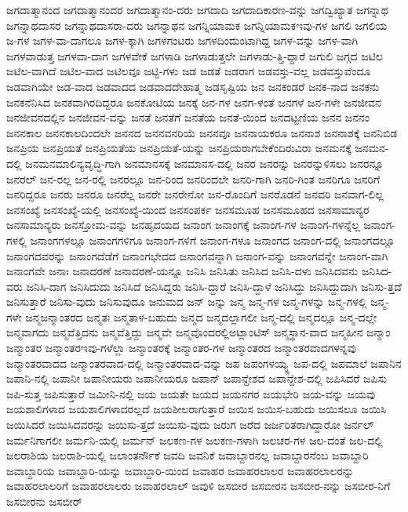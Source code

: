 {ಜಗದಾತ್ಮಾನಂದ
ಜಗದಾತ್ಮಾನಂದರ
ಜಗದಾತ್ಮಾನಂ-ದರು
ಜಗದಾದಿ
ಜಗದಾದಿಕಾರಣ-ವನ್ನು
ಜಗದ್ವಿಖ್ಯಾತ
ಜಗನ್ನಾಥ
ಜಗನ್ನಾಥದಾಸರ
ಜಗನ್ನಾಥದಾಸರಾ-ದರು
ಜಗನ್ನಾಥನ
ಜಗನ್ನಿಯಾಮಕ
ಜಗನ್ನಿಯಾಮಕಇವು-ಗಳ
ಜಗಲಿ
ಜಗಲಿಯ
ಜ-ಗಳ
ಜಗಳ-ವಾ-ದಾಗಲೂ
ಜಗಳ-ಕ್ಕಾಗಿ
ಜಗಳಗಂಟರು
ಜಗಳದಿಂದುಂಟಾಗಿದ್ದ
ಜಗಳ-ವನ್ನು
ಜಗಳ-ವಾಗಿ
ಜಗಳವಾಡುತ್ತ
ಜಗಳವಾ-ದಾಗ
ಜಗಳವೇಕೆ
ಜಗಳಾಡಿ
ಜಗಳಾಡುತ್ತಲೇ
ಜಗಳಾಡು-ತ್ತಿ-ದ್ದಾರೆ
ಜಗುಲಿ
ಜಗ್ಗದ
ಜಟಿಲ
ಜಟಿಲ-ವಾಗಿದೆ
ಜಟಿಲ-ವಾದ
ಜಟಿಲವೂ
ಜಟ್ಟಿ-ಗಳು
ಜಡ
ಜಡತೆ
ಜಡರಾಗ
ಜಡವಸ್ತು-ವಲ್ಲ
ಜಡವಸ್ತುವೆಂದೂ
ಜಡವಾಗಿಯೇ
ಜಡ-ವಾದ
ಜಡವಾದದ
ಜಡವಾದದೇಹಾತ್ಮ
ಜಡಸೃಷ್ಟಿಯ
ಜನ
ಜನಕಂಡರೆ
ಜನಕ-ನಾದ
ಜನಕನು
ಜನಕನೆನಿಸಿದ
ಜನಕವಾಗಿರದಿದ್ದರೂ
ಜನಕೋಟಿಯ
ಜನಕ್ಕೆ
ಜನ-ಗಳ
ಜನಗ-ಳಂತೆ
ಜನಗಳೆ
ಜನ-ಗಳೇ
ಜನಜೀವನ
ಜನಜೀವನದಲ್ಲಿನ
ಜನಜೀವನ-ವನ್ನು
ಜನತೆ
ಜನತೆಗೆ
ಜನತೆಯ
ಜನತೆ-ಯಿಂದ
ಜನದಟ್ಟಣಿಯ
ಜನನ
ಜನನಂ
ಜನನಕಾಲ
ಜನನಕಾಲದಿಂದಲೇ
ಜನನದ
ಜನನವನರಿಯೆ
ಜನನವೂ
ಜನನಾಯಕರೂ
ಜನನಾಶ
ಜನನಾಶಕ್ಕೆ
ಜನನಿಬಿಡ
ಜನಪ್ರಿಯ
ಜನಪ್ರಿಯತೆ
ಜನಪ್ರಿಯತೆಯ
ಜನಪ್ರಿಯತೆ-ಯನ್ನು
ಜನಪ್ರಿಯರಾಗಬೇಕೆಂದಿರುವಿರಾ
ಜನಮನಕ್ಕೆ
ಜನಮನ-ದಲ್ಲಿ
ಜನಮನಮಾಲಿನ್ಯವೃದ್ಧಿ-ಗಾಗಿ
ಜನಮಾನಸಕ್ಕೆ
ಜನಮಾನಸ-ದಲ್ಲಿ
ಜನರ
ಜನರನ್ನು
ಜನರನ್ನುಳಿಸಲು
ಜನರನ್ನೂ
ಜನರಲ್
ಜನ-ರಲ್ಲ
ಜನ-ರಲ್ಲಿ
ಜನರಲ್ಲೂ
ಜನ-ರಿಂದ
ಜನರಿಂದಲೇ
ಜನರಿ-ಗಾಗಿ
ಜನರಿ-ಗಿಂತ
ಜನರಿಗೂ
ಜನರಿಗೆ
ಜನರಿದ್ದರೂ
ಜನರು
ಜನರೂ
ಜನರೆಲ್ಲ
ಜನರೇ
ಜನರೇನೋ
ಜನ-ರೊಂದಿಗೆ
ಜನರೊಡನೆ
ಜನವರಿ
ಜನವಾಗ-ಲಿಲ್ಲ
ಜನಸಂಖ್ಯೆ
ಜನಸಂಖ್ಯೆ-ಯಲ್ಲಿ
ಜನಸಂಖ್ಯೆ-ಯಿಂದ
ಜನಸಂಪರ್ಕ
ಜನಸಮೂಹ
ಜನಸಮೂಹದ
ಜನಸಾಮಾನ್ಯರ
ಜನಸಾಮಾನ್ಯರು
ಜನಸ್ತೋಮ-ವನ್ನು
ಜನಹೃದಯದ
ಜನಾಂಗ
ಜನಾಂಗಕ್ಕೆ
ಜನಾಂಗ-ಗಳ
ಜನಾಂಗ-ಗಳನ್ನೆಲ್ಲ
ಜನಾಂಗ-ಗಳಲ್ಲಿ
ಜನಾಂಗಗಳಲ್ಲೂ
ಜನಾಂಗಗಳಿಗೂ
ಜನಾಂಗ-ಗಳಿಗೆ
ಜನಾಂಗ-ಗಳೂ
ಜನಾಂಗದ
ಜನಾಂಗ-ದಲ್ಲಿ
ಜನಾಂಗದಲ್ಲೂ
ಜನಾಂಗದವರನ್ನು
ಜನಾಂಗದೆಡೆಗೆ
ಜನಾಂಗಭೇದದ
ಜನಾಂಗವನ್ನಾಗಿ
ಜನಾಂಗ-ವನ್ನು
ಜನಾಂಗವನ್ನೇ
ಜನಾಂಗ-ವಾಗಿ
ಜನಾಂಗವೇ
ಜನಾಃ
ಜನಾದರಣೆ
ಜನಾದರಣೆ-ಯನ್ನೂ
ಜನಿಸಿ
ಜನಿಸಿತು
ಜನಿಸಿದ
ಜನಿಸಿ-ದಳು
ಜನಿಸಿದವನು
ಜನಿಸಿದ-ವರು
ಜನಿಸಿ-ದಾಗ
ಜನಿಸಿದುದು
ಜನಿಸಿದೆ
ಜನಿಸಿದ್ದರು
ಜನಿಸಿ-ದ್ದಾರೆ
ಜನಿಸಿ-ದ್ದಾಳೆ
ಜನಿಸಿದ್ದು
ಜನಿಸಿದ್ದುದಾಗಿ
ಜನಿಸು-ತ್ತದೆ
ಜನಿಸುತ್ತಾರೆ
ಜನಿಸು-ವುದು
ಜನಿಸುವುದೂ
ಜನುಮದ
ಜನ್
ಜನ್ನು
ಜನ್ಮ
ಜನ್ಮ-ಗಳ
ಜನ್ಮ-ಗಳನ್ನು
ಜನ್ಮ-ಗಳಲ್ಲಿ
ಜನ್ಮ-ಗಳೇ
ಜನ್ಮಜನ್ಮಾಂತರದ
ಜನ್ಮತಃ
ಜನ್ಮತಾಳ-ಬಹುದು
ಜನ್ಮದ
ಜನ್ಮದಲ್ಲಾಗಲೀ
ಜನ್ಮ-ದಲ್ಲಿ
ಜನ್ಮದಲ್ಲೂ
ಜನ್ಮ-ದಲ್ಲೇ
ಜನ್ಮವಾಗದು
ಜನ್ಮವೆತ್ತಿದನು
ಜನ್ಮವೆತ್ತಿದ್ದು
ಜನ್ಮವೇ
ಜನ್ಮವೊಂದರಲ್ಲಿಅಟ್ಲಾಂಟಿಸ್
ಜನ್ಮಸ್ಥಾನ-ವಾದ
ಜನ್ಮಹೀನ
ಜನ್ಮಾಂ
ಜನ್ಮಾಂತರ
ಜನ್ಮಾಂತರಇವು-ಗಳೆಲ್ಲಾ
ಜನ್ಮಾಂತರಕ್ಕೆ
ಜನ್ಮಾಂತರ-ಗಳ
ಜನ್ಮಾಂತರದ
ಜನ್ಮಾಂತರವಾದಗಳನ್ನವು
ಜನ್ಮಾಂತರವಾದದ
ಜನ್ಮಾಂತರವಾದ-ದಲ್ಲಿ
ಜನ್ಮಾಂತರವಾದ-ವನ್ನು
ಜಪ
ಜಪಂಗಳಯ್ಯ್ಣ
ಜಪ-ದಲ್ಲಿ
ಜಪಮಾಲೆ
ಜಪಾನಿನ
ಜಪಾನಿ-ನಲ್ಲಿ
ಜಪಾನೀ
ಜಪಾನೀಯರು
ಜಪಾನೀಯರೂ
ಜಪಾನ್
ಜಪಾನ್ದೇಶದ
ಜಪಾನ್ದೇಶ-ದಲ್ಲಿ
ಜಪಿಸಿದರೆ
ಜಪಿಸು
ಜಪಿ-ಸುತ್ತ
ಜಪಿಸುತ್ತಾರೆ
ಜಮೀನಿ-ನಲ್ಲಿ
ಜಯ
ಜಯತೇ
ಜಯದ
ಜಯನಗರ
ಜಯಭೇರಿ
ಜಯ-ವನ್ನು
ಜಯವು
ಜಯಶಾಲಿಗಳಾದ
ಜಯಶಾಲಿಗಳಾದರಲ್ಲದೆ
ಜಯಶೀಲರಾಗುತ್ತಾರೆ
ಜಯಿಸ
ಜಯಿಸ-ಬಹುದು
ಜಯಿಸಲೂ
ಜಯಿಸಿ
ಜಯಿಸಿದರೆ
ಜಯಿಸಿದವರನ್ನು
ಜಯಿಸು-ತ್ತದೆ
ಜಯಿಸು-ವುದು
ಜರುಗ
ಜರೆದ
ಜರ್ಜರಿತರಾಗಿದ್ದಾರೋ
ಜರ್ನಲ್
ಜರ್ಮನಿಗಾಗಲೀ
ಜರ್ಮನಿ-ಯಲ್ಲಿ
ಜರ್ಮನ್
ಜಲಕಣ-ಗಳ
ಜಲಕಣ-ಗಳಾಗಿ
ಜಲಚರ-ಗಳ
ಜಲ-ದಂತೆ
ಜಲ-ದಲ್ಲಿ
ಜಲರಾಶಿಯ
ಜಲರಾಶಿ-ಯಲ್ಲಿ
ಜಲಾಂತರ್ನೌಕೆ
ಜವದಿ
ಜವನಿಕೆ
ಜವಾಬ್ದಾರನಲ್ಲ
ಜವಾಬ್ದಾರನೆಂಬ
ಜವಾಬ್ದಾರಿ
ಜವಾಬ್ದಾರಿಯ
ಜವಾಬ್ದಾರಿ-ಯನ್ನು
ಜವಾಬ್ದಾರಿ-ಯಿಂದ
ಜವಾಹರ
ಜವಾಹರಲಾಲರ
ಜವಾಹರಲಾಲರನ್ನು
ಜವಾಹರಲಾಲರಿಗೆ
ಜವಾಹರಲಾಲರು
ಜವಾಹರಲಾಲ್
ಜವುಳಿ
ಜಸಬೀರ
ಜಸಬೀರನ
ಜಸಬೀರ-ನನ್ನು
ಜಸಬೀರ-ನಿಗೆ
ಜಸಬೀರನು
ಜಸಬೀರ್
}
